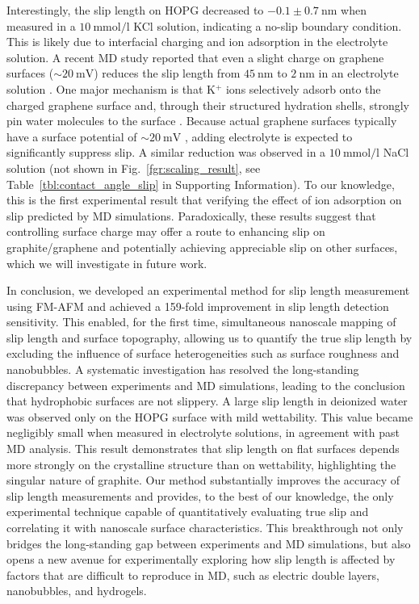 \documentclass[journal=jacsat,manuscript=article]{achemso}
\begin{document}
Interestingly, the slip length on HOPG decreased to \(-0.1 \pm \SI{0.7}{\nano\metre}\) when measured in a \(\SI{10}{\milli\mole\per\litre}\) KCl solution, indicating a no-slip boundary condition. This is likely due to interfacial charging and ion adsorption in the electrolyte solution. A recent MD study reported that even a slight charge on graphene surfaces (\(\sim\SI{20}{\milli\volt}\)) reduces the slip length from \(\SI{45}{\nano\metre}\) to \(\SI{2}{\nano\metre}\) in an electrolyte solution \cite{Xie2020-as}. One major mechanism is that K\(^+\) ions selectively adsorb onto the charged graphene surface and, through their structured hydration shells, strongly pin water molecules to the surface \cite{Mu2021-wm}. Because actual graphene surfaces typically have a surface potential of \(\sim\SI{20}{\milli\volt}\) \cite{Paruchuri2004-iu}, adding electrolyte is expected to significantly suppress slip. A similar reduction was observed in a \(\SI{10}{\milli\mole\per\litre}\) NaCl solution (not shown in Fig.~\ref{fgr:scaling_result}, see Table~\ref{tbl:contact_angle_slip} in Supporting Information). To our knowledge, this is the first experimental result that verifying the effect of ion adsorption on slip predicted by MD simulations. Paradoxically, these results suggest that controlling surface charge may offer a route to enhancing slip on graphite/graphene and potentially achieving appreciable slip on other surfaces, which we will investigate in future work.

In conclusion, we developed an experimental method for slip length measurement using FM-AFM and achieved a 159-fold improvement in slip length detection sensitivity. This enabled, for the first time, simultaneous nanoscale mapping of slip length and surface topography, allowing us to quantify the true slip length by excluding the influence of surface heterogeneities such as surface roughness and nanobubbles. A systematic investigation has resolved the long-standing discrepancy between experiments and MD simulations, leading to the conclusion that hydrophobic surfaces are not slippery. A large slip length in deionized water was observed only on the HOPG surface with mild wettability. This value became negligibly small when measured in electrolyte solutions, in agreement with past MD analysis. This result demonstrates that slip length on flat surfaces depends more strongly on the crystalline structure than on wettability, highlighting the singular nature of graphite. Our method substantially improves the accuracy of slip length measurements and provides, to the best of our knowledge, the only experimental technique capable of quantitatively evaluating true slip and correlating it with nanoscale surface characteristics. This breakthrough not only bridges the long-standing gap between experiments and MD simulations, but also opens a new avenue for experimentally exploring how slip length is affected by factors that are difficult to reproduce in MD, such as electric double layers, nanobubbles, and hydrogels. 
\end{document}
